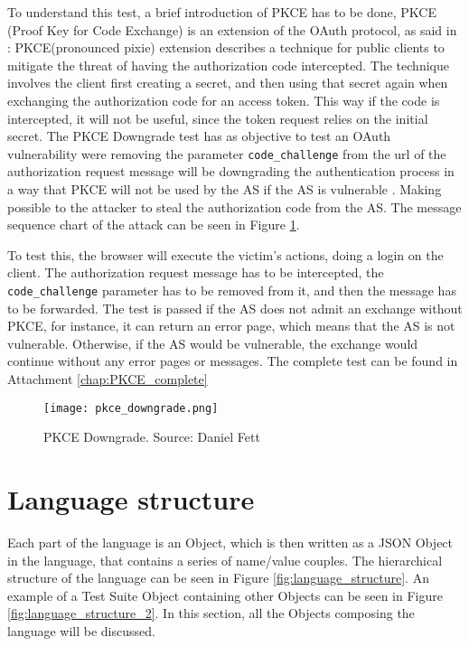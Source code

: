 To understand this test, a brief introduction of \gls{PKCE} has to be done, \gls{PKCE} (Proof Key for Code Exchange) is an extension of the \gls{OAuth} protocol, as said in \cite{pkce_explanation}: \gls{PKCE}(pronounced pixie) extension describes a technique for public clients to mitigate the threat of having the authorization code intercepted. The technique involves the client first creating a secret, and then using that secret again when exchanging the authorization code for an access token. This way if the code is intercepted, it will not be useful, since the token request relies on the initial secret. 
The \gls{PKCE} Downgrade test has as objective to test an \gls{OAuth} vulnerability were removing the parameter \texttt{code\_challenge} from the url of the authorization request message will be downgrading the authentication process in a way that \gls{PKCE} will not be used by the AS if the AS is vulnerable \cite{pkce_downgrade}. Making possible to the attacker to steal the authorization code from the AS. The message sequence chart of the attack can be seen in Figure \ref{fig:pkce_downgrade}.

To test this, the browser will execute the victim's actions, doing a login on the client. The authorization request message has to be intercepted, the \texttt{code\_challenge} parameter has to be removed from it, and then the message has to be forwarded. The test is passed if the AS does not admit an exchange without PKCE, for instance, it can return an error page, which means that the AS is not vulnerable. Otherwise, if the AS would be vulnerable, the exchange would continue without any error pages or messages.
The complete test can be found in Attachment \ref{chap:PKCE_complete}

\begin{figure}[h]
    \texttt{[image: pkce\_downgrade.png]}
    \caption{PKCE Downgrade. Source: Daniel Fett \cite{pkce_msc_image}}
    \label{fig:pkce_downgrade}
\end{figure}

\section{Language structure}
Each part of the language is an Object, which is then written as a JSON Object in the language, that contains a series of name/value couples. The hierarchical structure of the language can be seen in Figure \ref{fig:language_structure}. An example of a Test Suite Object containing other Objects can be seen in Figure \ref{fig:language_structure_2}. In this section, all the Objects composing the language will be discussed.

